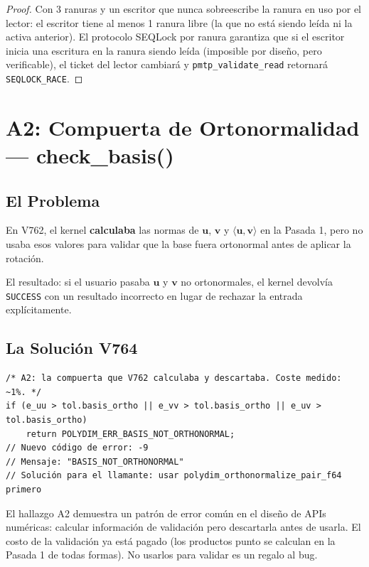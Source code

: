 \begin{proof}
Con 3 ranuras y un escritor que nunca sobreescribe la ranura en uso por el lector:
el escritor tiene al menos 1 ranura libre (la que no está siendo leída ni la activa anterior).
El protocolo SEQLock por ranura garantiza que si el escritor inicia una escritura
en la ranura siendo leída (imposible por diseño, pero verificable), el ticket
del lector cambiará y \texttt{pmtp\_validate\_read} retornará \texttt{SEQLOCK\_RACE}.
\end{proof}

\section{A2: Compuerta de Ortonormalidad --- check\_basis()}

\subsection{El Problema}

En V762, el kernel \textbf{calculaba} las normas de $\mathbf{u}$, $\mathbf{v}$ y
$\langle \mathbf{u}, \mathbf{v} \rangle$ en la Pasada 1, pero no usaba esos valores
para validar que la base fuera ortonormal antes de aplicar la rotación.

El resultado: si el usuario pasaba $\mathbf{u}$ y $\mathbf{v}$ no ortonormales,
el kernel devolvía \texttt{SUCCESS} con un resultado incorrecto en lugar de rechazar
la entrada explícitamente.

\subsection{La Solución V764}

\begin{verbatim}
/* A2: la compuerta que V762 calculaba y descartaba. Coste medido: ~1%. */
if (e_uu > tol.basis_ortho || e_vv > tol.basis_ortho || e_uv > tol.basis_ortho)
    return POLYDIM_ERR_BASIS_NOT_ORTHONORMAL;
// Nuevo código de error: -9
// Mensaje: "BASIS_NOT_ORTHONORMAL"
// Solución para el llamante: usar polydim_orthonormalize_pair_f64 primero
\end{verbatim}

\begin{remark}
El hallazgo A2 demuestra un patrón de error común en el diseño de APIs numéricas:
calcular información de validación pero descartarla antes de usarla. El costo de
la validación ya está pagado (los productos punto se calculan en la Pasada 1 de
todas formas). No usarlos para validar es un regalo al bug.
\end{remark}

